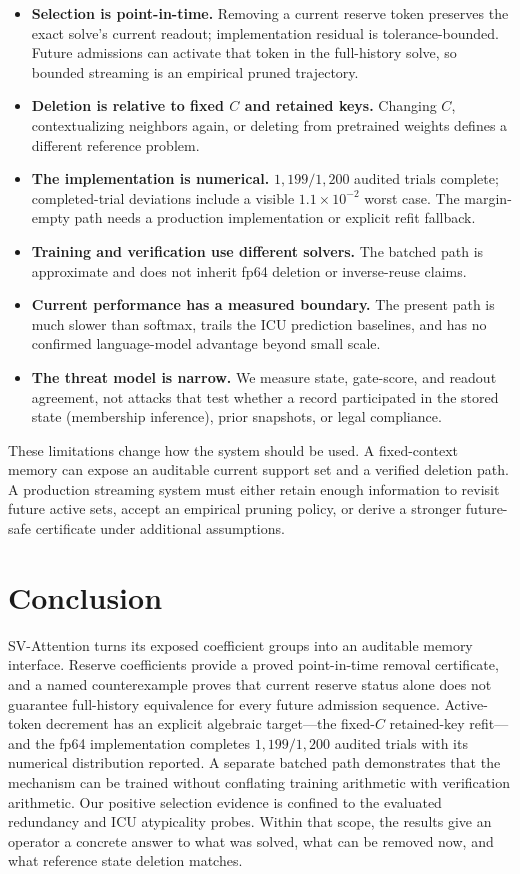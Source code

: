 \begin{itemize}
\item \textbf{Selection is point-in-time.} Removing a current reserve token
preserves the exact solve's current readout; implementation residual is
tolerance-bounded. Future admissions can activate that token in the full-history
solve, so bounded streaming is an empirical pruned trajectory.
\item \textbf{Deletion is relative to fixed \(C\) and retained keys.} Changing
\(C\), contextualizing neighbors again, or deleting from pretrained weights
defines a different reference problem.
\item \textbf{The implementation is numerical.} \(1{,}199/1{,}200\) audited
trials complete; completed-trial deviations include a visible
\(1.1\times10^{-2}\) worst case. The margin-empty path needs a production
implementation or explicit refit fallback.
\item \textbf{Training and verification use different solvers.} The batched
path is approximate and does not inherit fp64 deletion or inverse-reuse claims.
\item \textbf{Current performance has a measured boundary.} The present path is
much slower than softmax, trails the ICU prediction baselines, and has no
confirmed language-model advantage beyond small scale.
\item \textbf{The threat model is narrow.} We measure state, gate-score, and
readout agreement, not attacks that test whether a record participated in the
stored state (membership inference), prior snapshots, or legal compliance.
\end{itemize}

These limitations change how the system should be used. A fixed-context memory
can expose an auditable current support set and a verified deletion path. A
production streaming system must either retain enough information to revisit
future active sets, accept an empirical pruning policy, or derive a stronger
future-safe certificate under additional assumptions.

\section{Conclusion}

SV-Attention turns its exposed coefficient groups into an auditable memory interface.
Reserve coefficients provide a proved point-in-time removal certificate, and a
named counterexample proves that current reserve status alone does not
guarantee full-history equivalence for every future admission sequence.
Active-token decrement has an explicit algebraic target---the fixed-\(C\)
retained-key refit---and the fp64 implementation completes
\(1{,}199/1{,}200\) audited trials with its numerical distribution reported. A
separate batched path demonstrates that the mechanism can be trained without
conflating training arithmetic with verification arithmetic. Our positive
selection evidence is confined to the evaluated redundancy and ICU
atypicality probes. Within that scope, the results give an operator a concrete
answer to what was solved, what can be removed now, and what reference state
deletion matches.

